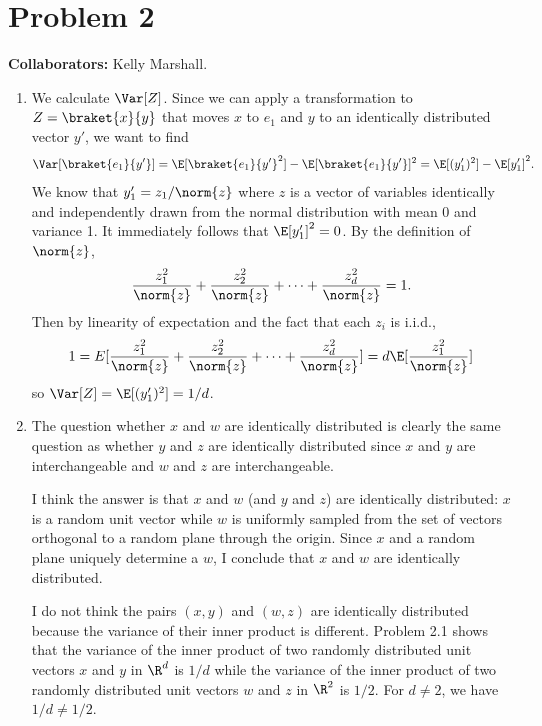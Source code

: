 \newpage
\section*{Problem 2}
\textbf{Collaborators:}  Kelly Marshall.
\medskip

\begin{enumerate}
    \item We calculate $\Var[Z]$.
    Since we can apply a transformation to
    $Z=\braket{x}{y}$ that moves $x$ to $e_1$
    and $y$ to an identically distributed
    vector $y'$, we want to find
    \begin{align}
        \Var[\braket{e_1}{y'}] =
        \E[\braket{e_1}{y'}^2] - \E[\braket{e_1}{y'}]^2
        = \E[(y'_1)^2] - \E[y'_1]^2.
        \nonumber
    \end{align}
    We know that $y'_1=z_1/\norm{z}$ where $z$
    is a vector of variables identically and independently
    drawn from the normal distribution
    with mean 0 and variance 1.
    It immediately follows that $\E[y'_1]^2=0$.
    By the definition of $\norm{z}$,
    \begin{align}
        \frac{z_1^2}{\norm{z}} + \frac{z_2^2}{\norm{z}}
        + \cdots + \frac{z_d^2}{\norm{z}} = 1.
        \nonumber
    \end{align}
    Then by linearity of expectation and
    the fact that each $z_i$ is i.i.d.,
    \begin{align}
        1 = E[\frac{z_1^2}{\norm{z}} + \frac{z_2^2}{\norm{z}}
        + \cdots + \frac{z_d^2}{\norm{z}}]
        = d \E[\frac{z_1^2}{\norm{z}}]
        \nonumber
    \end{align}
    so $\Var[Z] = \E[(y'_1)^2] = 1/d$.

    \item
    The question whether $x$ and $w$ are
    identically distributed is clearly the same
    question as whether $y$ and $z$ are identically
    distributed since $x$ and $y$ are interchangeable
    and $w$ and $z$ are interchangeable.

    I think the answer is that $x$ and $w$
    (and $y$ and $z$) are identically
    distributed:
    $x$ is a random unit vector while $w$
    is uniformly sampled from the set of vectors
    orthogonal to a random plane through the origin.
    Since $x$ and a random plane
    uniquely determine a $w$,
    I conclude that $x$ and $w$ are identically distributed.

    I do not think the pairs $(x,y)$ and $(w,z)$
    are identically distributed because
    the variance of their inner product is different.
    Problem 2.1 shows that the variance of the inner product
    of two randomly distributed unit vectors $x$ and $y$ in
    $\R^d$ is $1/d$ while the variance of the inner product
    of two randomly distributed unit vectors $w$ and $z$ in
    $\R^2$ is $1/2$.
    For $d\neq 2$, we have $1/d \neq 1/2$.

\end{enumerate}

